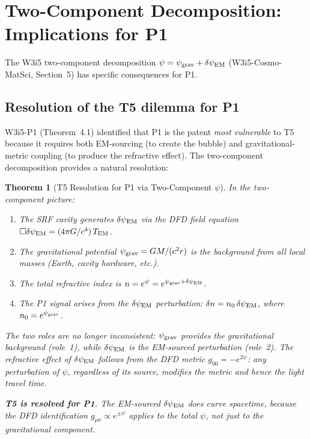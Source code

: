 \documentclass[11pt]{article}
\newcommand{\psigrav}{\psi_{\rm grav}}
\newcommand{\dpsiEM}{\delta\psi_{\rm EM}}
\newtheorem{theorem}{Theorem}[section]
\theoremstyle{definition}
\theoremstyle{remark}
\begin{document}
\section{Two-Component Decomposition: Implications for P1}
\label{sec:two_component_P1}

The W3i5 two-component decomposition $\psi = \psigrav + \dpsiEM$
(W3i5-Cosmo-MatSci, Section~5) has specific consequences for P1.

\subsection{Resolution of the T5 dilemma for P1}
\label{ssec:T5_resolution}

W3i5-P1 (Theorem~4.1) identified that P1 is the patent \emph{most
vulnerable} to T5 because it requires both EM-sourcing (to create the
bubble) and gravitational-metric coupling (to produce the refractive
effect). The two-component decomposition provides a natural resolution:

\begin{theorem}[T5 Resolution for P1 via Two-Component $\psi$]
\label{thm:T5_P1_resolution}
In the two-component picture:
\begin{enumerate}[nosep]
\item The SRF cavity generates $\dpsiEM$ via the DFD field equation
  $\Box\dpsiEM = (4\pi G/c^4)\,T_{\rm EM}$.
\item The gravitational potential $\psigrav = GM/(c^2 r)$ is the
  background from all local masses (Earth, cavity hardware, etc.).
\item The total refractive index is $n = e^{\psi} = e^{\psigrav + \dpsiEM}$.
\item The P1 signal arises from the $\dpsiEM$ perturbation:
  $\delta n = n_0\,\dpsiEM$, where $n_0 = e^{\psigrav}$.
\end{enumerate}

The two roles are no longer inconsistent: $\psigrav$ provides the
gravitational background (role~1), while $\dpsiEM$ is the EM-sourced
perturbation (role~2). The refractive effect of $\dpsiEM$ follows from
the DFD metric $g_{00} = -e^{2\psi}$: any perturbation of $\psi$,
regardless of its source, modifies the metric and hence the light
travel time.

\textbf{T5 is resolved for P1}. The EM-sourced $\dpsiEM$ does curve
spacetime, because the DFD identification $g_{\mu\nu} \propto e^{\pm\psi}$
applies to the total $\psi$, not just to the gravitational component.
\end{theorem}
\end{document}
